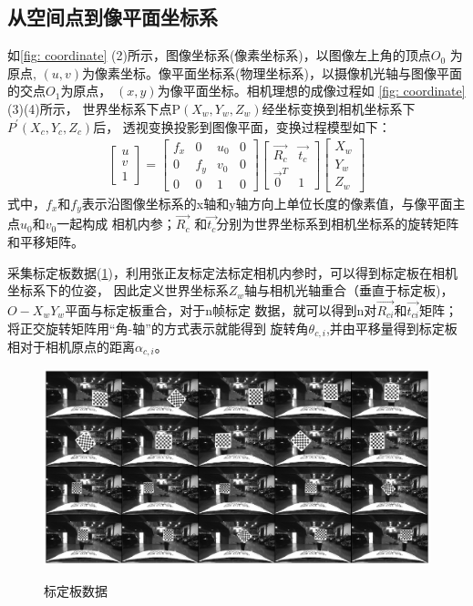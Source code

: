 \subsection{从空间点到像平面坐标系}
如\figurename\ref{fig: coordinate} (2)所示，图像坐标系(像素坐标系)，以图像左上角的顶点$O_{0}$
为原点, $(u,v)$为像素坐标。像平面坐标系(物理坐标系)，以摄像机光轴与图像平面的交点$O_{1}$为原点，
$(x,y)$为像平面坐标。相机理想的成像过程如 \figurename\ref{fig: coordinate} (3)(4)所示，
世界坐标系下点P$(X_{w},Y_{w},Z_{w})$经坐标变换到相机坐标系下$P^{'}(X_{c},Y_{c},Z_{c})$后，
透视变换投影到图像平面，变换过程模型如下：
\begin{equation}
\begin{aligned}
\begin{bmatrix} u \\v\\1 \end{bmatrix}=
\begin{bmatrix} f_{x} & 0 & u_{0} & 0 \\0 & f_{y} & v_{0} & 0\\0 & 0 & 1 & 0 \end{bmatrix}         
\begin{bmatrix} \vec{R_{c}} & \vec{t_{c}}\\ \vec{0}^{T} & 1 \end{bmatrix}
\begin{bmatrix} X_w \\Y_w\\Z_w \end{bmatrix}
\end{aligned}
\end{equation}
式中，$f_{x}$和$f_{y}$表示沿图像坐标系的x轴和y轴方向上单位长度的像素值，与像平面主点$u_{0}$和$v_{0}$一起构成
相机内参；$\vec{R_{c}}$ 和$\vec{t_{c}}$分别为世界坐标系到相机坐标系的旋转矩阵和平移矩阵。

采集标定板数据(\figurename\ref{fig: calib})，利用张正友标定法标定相机内参时，可以得到标定板在相机坐标系下的位姿，
因此定义世界坐标系$Z_{w}$轴与相机光轴重合（垂直于标定板)，$O-X_{w}Y_{w}$平面与标定板重合，对于n帧标定
数据，就可以得到n对$\vec{R_{ci}}$和$\vec{t_{ci}}$矩阵；将正交旋转矩阵用“角-轴”的方式表示就能得到
旋转角$\theta_{c,i}$,并由平移量得到标定板相对于相机原点的距离$\alpha_{c,i}$。

\begin{figure}[htbp]
	\centering
    \includegraphics[width=16cm]{fig/data1.eps} \\
	\caption{标定板数据}\label{fig: calib}
\end{figure}

